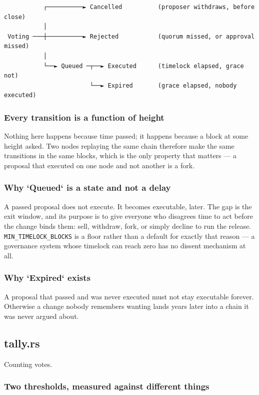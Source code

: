 \documentclass[11pt,a4paper]{article}
\begin{document}
\begin{verbatim}
           ┌──────────► Cancelled          (proposer withdraws, before close)
           │
 Voting ───┼──────────► Rejected           (quorum missed, or approval missed)
           │
           └──► Queued ─┬──► Executed      (timelock elapsed, grace not)
                        └──► Expired       (grace elapsed, nobody executed)
\end{verbatim}

\subsubsection{Every transition is a function of height}

Nothing here happens because time passed; it happens because a block at some
height asked. Two nodes replaying the same chain therefore make the same
transitions in the same blocks, which is the only property that matters —
a proposal that executed on one node and not another is a fork.

\subsubsection{Why `Queued` is a state and not a delay}

A passed proposal does not execute. It becomes executable, later. The gap is
the exit window, and its purpose is to give everyone who disagrees time to
act before the change binds them: sell, withdraw, fork, or simply decline to
run the release. \texttt{MIN\_TIMELOCK\_BLOCKS} is a floor rather than a default for
exactly that reason — a governance system whose timelock can reach zero has
no dissent mechanism at all.

\subsubsection{Why `Expired` exists}

A proposal that passed and was never executed must not stay executable
forever. Otherwise a change nobody remembers wanting lands years later into
a chain it was never argued about.

\subsection{tally.rs}
Counting votes.

\subsubsection{Two thresholds, measured against different things}
\end{document}
